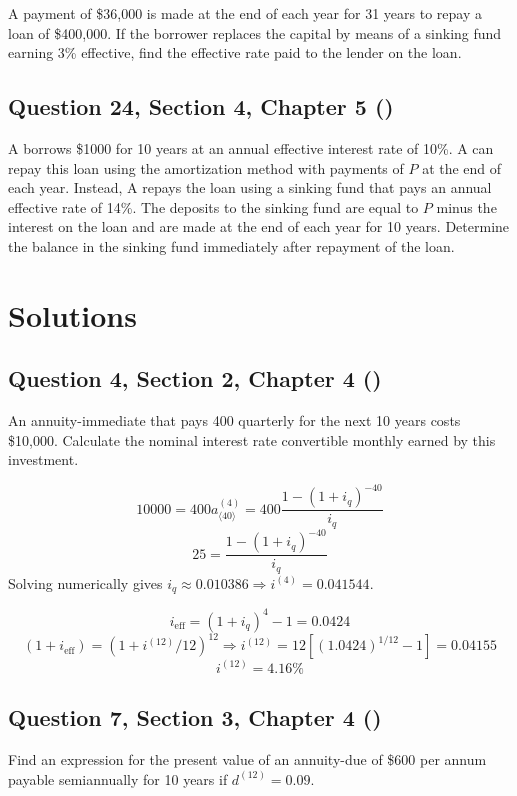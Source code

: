 \documentclass[12pt, a4paper]{article}
\newcommand{\angl}[1]{\langle #1 \rangle}
\begin{document}
\noindent A payment of \$36{,}000 is made at the end of each year for 31 years to repay a loan of \$400{,}000. If the borrower replaces the capital by means of a sinking fund earning 3\% effective, find the effective rate paid to the lender on the loan.

\subsection*{Question 24, Section 4, Chapter 5  (\cite{toi3rd})}

\noindent A borrows \$1000 for 10 years at an annual effective interest rate of 10\%. A can repay this loan using the amortization method with payments of \( P \) at the end of each year. Instead, A repays the loan using a sinking fund that pays an annual effective rate of 14\%. The deposits to the sinking fund are equal to \( P \) minus the interest on the loan and are made at the end of each year for 10 years. Determine the balance in the sinking fund immediately after repayment of the loan.

\newpage

\section*{Solutions}

\subsection*{Question 4, Section 2, Chapter 4  (\cite{toi3rd})}

\noindent An annuity-immediate that pays 400 quarterly for the next 10 years costs \$10{,}000. Calculate the nominal interest rate convertible monthly earned by this investment.

\[
10000 = 400 a_{\angl{40}}^{(4)} = 400 \frac{1 - (1 + i_q)^{-40}}{i_q}
\]
\[
25 = \frac{1 - (1 + i_q)^{-40}}{i_q}
\]
Solving numerically gives \( i_q \approx 0.010386 \Rightarrow i^{(4)} = 0.041544 \).

\[
i_{\text{eff}} = (1 + i_q)^4 - 1 = 0.0424
\]
\[
(1 + i_{\text{eff}}) = (1 + i^{(12)}/12)^{12}
\Rightarrow i^{(12)} = 12[(1.0424)^{1/12} - 1] = 0.04155
\]
\[
\boxed{i^{(12)} = 4.16\%}
\]

\subsection*{Question 7, Section 3, Chapter 4  (\cite{toi3rd})}

\noindent Find an expression for the present value of an annuity-due of \$600 per annum payable semiannually for 10 years if \( d^{(12)} = 0.09. \)
\end{document}
